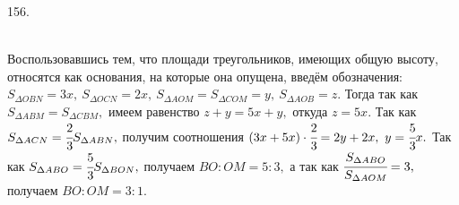 156. \begin{figure}[ht!]
\end{figure}\\
Воспользовавшись тем, что площади треугольников, имеющих общую высоту, относятся как основания, на которые она опущена, введём обозначения: $S_{\Delta OBN}=3x,\ S_{\Delta OCN}=2x,\ S_{\Delta AOM}=S_{\Delta COM}=y,\ S_{\Delta AOB}=z.$ Тогда так как $S_{\Delta ABM}=S_{\Delta CBM},$ имеем равенство $z+y=5x+y,$ откуда $z=5x.$ Так как $S_{\Delta ACN}=\cfrac{2}{3}S_{\Delta ABN},$ получим соотношения $(3x+5x)\cdot\cfrac{2}{3}=2y+2x,\ y=\cfrac{5}{3}x.$ Так как $S_{\Delta ABO}=\cfrac{5}{3}S_{\Delta BON},$ получаем $BO:OM=5:3,$ а так как $\cfrac{S_{\Delta ABO}}{S_{\Delta AOM}}=3,$ получаем $BO:OM=3:1.$\\
